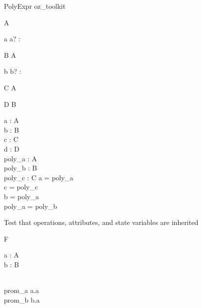 \begin{zsection}
  \SECTION PolyExpr \parents oz\_toolkit
\end{zsection}

\begin{class}{A}
  \begin{op}{a}
    a? : \nat
  \end{op}
\end{class}

\begin{class}{B}
  \inherits A
  \begin{op}{b}
    b? : \nat
  \end{op}
\end{class}

\begin{class}{C}
  \inherits A
\end{class}

\begin{class}{D}
  \inherits B
\end{class}

\begin{axdef}
  a : A\\
  b : B\\
  c : C\\
  d : D\\
  poly\_a : \poly A\\
  poly\_b : \poly B\\
  poly\_c : \poly C
\where
  a = poly\_a\\
  c = poly\_c\\
  b = poly\_a\\  
  poly\_a = poly\_b\\
\end{axdef}


Test that operations, attributes, and state variables are inherited
\begin{class}{F}
  \begin{state}
    a : \poly A\\
    b : B\\
  \end{state}\\
  prom\_a \sdef a.a\\
  prom\_b \sdef b.a\\
\end{class}
